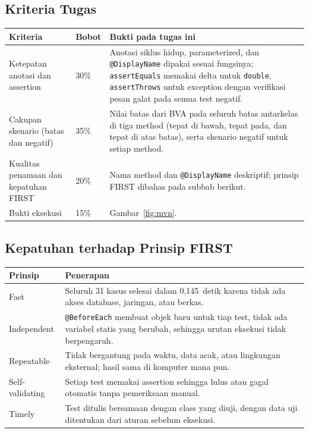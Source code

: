 \documentclass[11pt,a4paper]{article}
\newcommand{\waktutest}{0,145}    %
\newcommand{\hrow}{\rowcolor{headrow}}
\begin{document}
\subsection{Kriteria Tugas}
\begin{center}
\begin{tabularx}{\textwidth}{@{}P{4.1cm}P{1.3cm}Y@{}}
\toprule
\hrow \textbf{Kriteria} & \textbf{Bobot} & \textbf{Bukti pada tugas ini} \\
\midrule
Ketepatan anotasi dan assertion & 30\% & Anotasi siklus hidup, parameterized, dan \texttt{@DisplayName} dipakai sesuai fungsinya; \texttt{assertEquals} memakai delta untuk \texttt{double}, \texttt{assertThrows} untuk exception dengan verifikasi pesan galat pada semua test negatif. \\
Cakupan skenario (batas dan negatif) & 35\% & Nilai batas dari BVA pada seluruh batas antarkelas di tiga method (tepat di bawah, tepat pada, dan tepat di atas batas), serta skenario negatif untuk setiap method. \\
Kualitas penamaan dan kepatuhan FIRST & 20\% & Nama method dan \texttt{@DisplayName} deskriptif; prinsip FIRST dibahas pada subbab berikut. \\
Bukti eksekusi & 15\% & Gambar~\ref{fig:mvn}. \\
\bottomrule
\end{tabularx}
\end{center}

\subsection{Kepatuhan terhadap Prinsip FIRST}
\begin{center}
\begin{tabularx}{\textwidth}{@{}P{3.1cm}Y@{}}
\toprule
\hrow \textbf{Prinsip} & \textbf{Penerapan} \\
\midrule
Fast & Seluruh 31 kasus selesai dalam \waktutest\ detik karena tidak ada akses database, jaringan, atau berkas. \\
Independent & \texttt{@BeforeEach} membuat objek baru untuk tiap test, tidak ada variabel statis yang berubah, sehingga urutan eksekusi tidak berpengaruh. \\
Repeatable & Tidak bergantung pada waktu, data acak, atau lingkungan eksternal; hasil sama di komputer mana pun. \\
Self-validating & Setiap test memakai assertion sehingga lulus atau gagal otomatis tanpa pemeriksaan manual. \\
Timely & Test ditulis bersamaan dengan class yang diuji, dengan data uji ditentukan dari aturan sebelum eksekusi. \\
\bottomrule
\end{tabularx}
\end{center}
\end{document}
